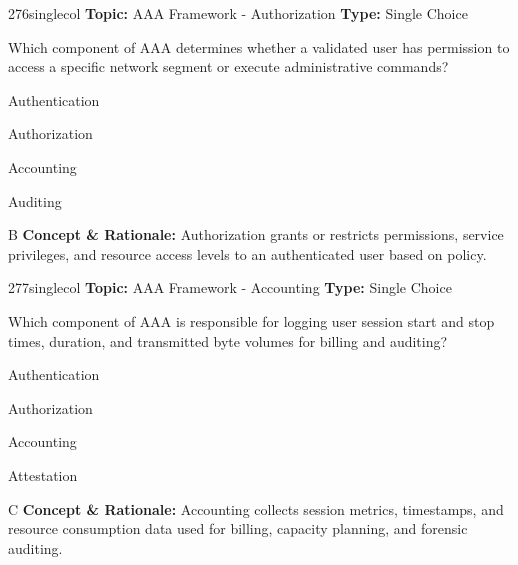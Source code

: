 \begin{qcard}{276}{singlecol}
\textcolor{darkslate!75}{\small\textbf{Topic:} AAA Framework - Authorization \hfill \textbf{Type:} Single Choice}\vspace{0.4em}\par
Which component of AAA determines whether a validated user has permission to access a specific network segment or execute administrative commands?
\begin{qoptions}
\item Authentication
\item Authorization
\item Accounting
\item Auditing
\end{qoptions}
\end{qcard}
\nopagebreak
\begin{explainbox}{B}
\textbf{Concept \& Rationale:} Authorization grants or restricts permissions, service privileges, and resource access levels to an authenticated user based on policy.
\end{explainbox}

\begin{qcard}{277}{singlecol}
\textcolor{darkslate!75}{\small\textbf{Topic:} AAA Framework - Accounting \hfill \textbf{Type:} Single Choice}\vspace{0.4em}\par
Which component of AAA is responsible for logging user session start and stop times, duration, and transmitted byte volumes for billing and auditing?
\begin{qoptions}
\item Authentication
\item Authorization
\item Accounting
\item Attestation
\end{qoptions}
\end{qcard}
\nopagebreak
\begin{explainbox}{C}
\textbf{Concept \& Rationale:} Accounting collects session metrics, timestamps, and resource consumption data used for billing, capacity planning, and forensic auditing.
\end{explainbox}

